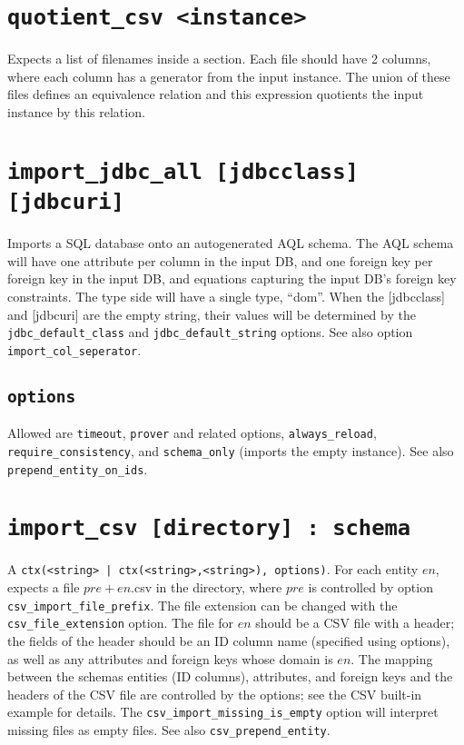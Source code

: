 \documentclass[10pt]{book}
\begin{document}
\section{{\tt quotient\_csv <instance>}}
Expects a list of filenames inside a section.  Each file should have 2 columns, where each column has a generator from the input instance.  The union of these files defines an equivalence relation and this expression quotients the input instance by this relation. 

\section{{\tt import\_jdbc\_all [jdbcclass] [jdbcuri]}}

Imports a SQL database onto an autogenerated AQL schema.  The AQL schema will have one attribute per column in the input DB, and one foreign key per foreign key in the input DB, and equations capturing the input DB's foreign key constraints.  The type side will have a single type, ``dom''.  When the [jdbcclass] and [jdbcuri] are the empty string, their values will be determined by the {\tt jdbc\_default\_class} and {\tt jdbc\_default\_string} options.  See also option {\tt import\_col\_seperator}.

\subsection{{\tt options}}
Allowed are {\tt timeout}, {\tt prover} and related options, {\tt always\_reload}, {\tt require\_consistency}, and {\tt schema\_only} (imports the empty instance).  See also {\tt prepend\_entity\_on\_ids}.

\section{{\tt import\_csv [directory] : schema}}
A {\tt ctx(<string> | ctx(<string>,<string>), options)}.  For each entity $en$, expects a file $pre + en$.csv in the directory, where $pre$ is controlled by option {\tt csv\_import\_file\_prefix}.  The file extension can be changed with the {\tt csv\_file\_extension} option.  The file for $en$ should be a CSV file with a header; the fields of the header should be an ID column name (specified using options), as well as any attributes and foreign keys whose domain is $en$.  The mapping between the schemas entities (ID columns), attributes, and foreign keys and the headers of the CSV file are controlled by the options; see the CSV built-in example for details.  The {\tt csv\_import\_missing\_is\_empty} option will interpret missing files as empty files.  See also {\tt csv\_prepend\_entity}. 
\end{document}

